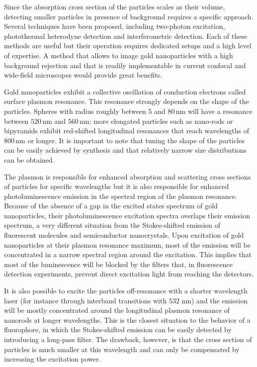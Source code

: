 \documentclass[journal=nalefd,manuscript=letter]{achemso}
\newcommand{\nm}{\ensuremath{\,\textrm{nm}}}
\begin{document}
Since the absorption cross section of the particles scales as their volume, detecting
smaller particles in presence of background requires a specific approach.
Several techniques have been proposed, including two-photon
excitation\cite{VandenBroek2013}, photothermal \mbox{heterodyne}
detection\cite{Berciaud2006} and interferometric detection\cite{Ignatovich2006}.
Each of these methods are useful but their operation requires dedicated setups
and a high level of expertise. A method that allows to image gold nanoparticles with
a high background rejection and that is readily implementable in current
confocal and wide-field microscopes would provide great benefits.

Gold nanoparticles exhibit a collective oscillation of conduction electrons
called surface plasmon resonance\cite{Bouhelier2005}. This resonance strongly
depends on the shape of the particles\cite{Dulkeith2004}\cite{Link2000a}.
Spheres with radius roughly between $5$ and $80\nm$ will have a resonance
between $520\nm$ and $560\nm$; more elongated particles such as nano-rods or
bipyramids\cite{Rao2015} exhibit red-shifted longitudinal resonances that reach
wavelengths of $800\nm$ or longer\cite{Ngoc2015}. It is important to note that tuning the shape
of the particles can be easily achieved by synthesis and that relatively narrow
size distributions can be obtained\cite{Nikoobakht2003}.

The plasmon is responsible for enhanced absorption and scattering cross
sections\cite{Ni2008} of particles for specific wavelengths but it is also
responsible for enhanced photoluminescence emission in the spectral region of
the plasmon resonance. Because of the absence of a gap in the excited states
spectrum of gold nanoparticles, their photoluminescence excitation spectra
overlaps their emission spectrum\cite{Yorulmaz2012}, a very different situation
from the Stokes-shifted emission of fluorescent molecules and semiconductor
nanocrystals. Upon excitation of gold nanoparticles at their plasmon resonance
maximum, most of the emission will be concentrated in a narrow spectral region
around the excitation. This implies that most of the luminescence will be
blocked by the filters that, in fluorescence detection experiments, prevent
direct excitation light from reaching the detectors.

It is also possible to excite the particles off-resonance with a shorter
wavelength laser (for instance through interband transitions with $532\,\nm$)
and the emission will be mostly concentrated around the longitudinal plasmon
resonance of nanorods at longer wavelengths. This is the closest situation to
the behavior of a fluorophore, in which the Stokes-shifted emission can be
easily detected by introducing a long-pass filter. The drawback, however, is
that the cross section of particles is much smaller at this wavelength and can
only be compensated by increasing the excitation power.
\end{document}
